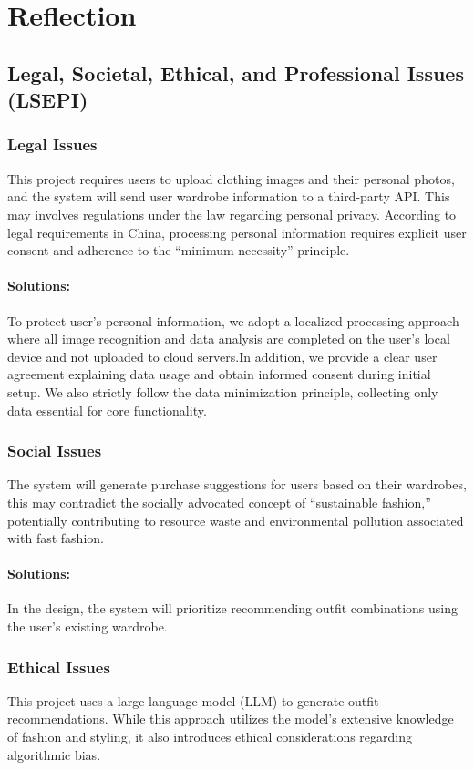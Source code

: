 \chapter{Reflection}
\label{ch:reflection}

\section{Legal, Societal, Ethical, and Professional Issues (LSEPI)}
\subsection{Legal Issues}
This project requires users to upload clothing images and their personal photos, and the system will send user wardrobe information to a third-party API. This may involves regulations under the law regarding personal privacy. According to legal requirements in China, processing personal information requires explicit user consent and adherence to the “minimum necessity” principle.

\subsubsection{Solutions:}
To protect user's personal information, we adopt a localized processing approach where all image recognition and data analysis are completed on the user’s local device and not uploaded to cloud servers.In addition, we provide a clear user agreement explaining data usage and obtain informed consent during initial setup. We also strictly follow the data minimization principle, collecting only data essential for core functionality.

\subsection{Social Issues}
The system will generate purchase suggestions for users based on their wardrobes, this may contradict the socially advocated concept of “sustainable fashion,” potentially contributing to resource waste and environmental pollution associated with fast fashion.

\subsubsection{Solutions:}
In the design, the system will prioritize recommending outfit combinations using the user’s existing wardrobe.

\subsection{Ethical Issues}
This project uses a large language model (LLM) to generate outfit recommendations. While this approach utilizes the model’s extensive knowledge of fashion and styling, it also introduces ethical considerations regarding algorithmic bias.

